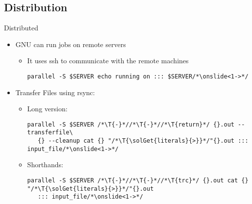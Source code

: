 \subsection{Distribution}
{
\begin{frame}[fragile]{Distributed}
\begin{itemize}[<+(1)->]
   \itemsep6pt
   \item GNU \LogoParallel can run jobs on remote servers \begin{itemize}
      \item It uses ssh to communicate with the remote machines\pause
      \begin{verbatim}
parallel -S $SERVER echo running on ::: $SERVER/*\onslide<1->*/
      \end{verbatim}
   \end{itemize}
   \item Transfer Files using rsync:
\begin{itemize}
   \item Long version:
   \begin{verbatim}
parallel -S $SERVER /*\T{-}*//*\T{-}*//*\T{return}*/ {}.out --transferfile\
   {} --cleanup cat {} "/*\T{\solGet{literals}{>}}*/"{}.out ::: input_file/*\onslide<1->*/
   \end{verbatim}
   \item Shorthands:
\begin{verbatim}
parallel -S $SERVER /*\T{-}*//*\T{-}*//*\T{trc}*/ {}.out cat {} "/*\T{\solGet{literals}{>}}*/"{}.out
   ::: input_file/*\onslide<1->*/
\end{verbatim}
\end{itemize}
\end{itemize}
\end{frame}
\SidebarReset

}
